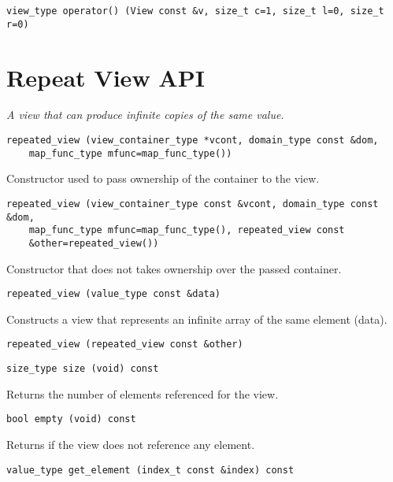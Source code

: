 \begin{verbatim}
view_type operator() (View const &v, size_t c=1, size_t l=0, size_t r=0)
\end{verbatim}

\section{Repeat View API } \label{sec-rep-vw}

\emph{ A view that can produce infinite copies of the same value. }

\begin{verbatim}
repeated_view (view_container_type *vcont, domain_type const &dom,
    map_func_type mfunc=map_func_type())
\end{verbatim}

Constructor used to pass ownership of the container to the view.

\begin{verbatim}
repeated_view (view_container_type const &vcont, domain_type const &dom,
    map_func_type mfunc=map_func_type(), repeated_view const
    &other=repeated_view())
\end{verbatim}

Constructor that does not takes ownership over the passed container.

\begin{verbatim}
repeated_view (value_type const &data)
\end{verbatim}

Constructs a view that represents an infinite array of the same element (data).

\begin{verbatim}
repeated_view (repeated_view const &other)
\end{verbatim}

\begin{verbatim}
size_type size (void) const
\end{verbatim}

Returns the number of elements referenced for the view.

\begin{verbatim}
bool empty (void) const
\end{verbatim}

Returns if the view does not reference any element.

\begin{verbatim}
value_type get_element (index_t const &index) const
\end{verbatim}


